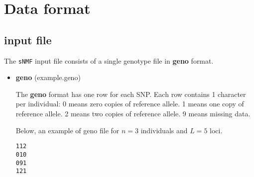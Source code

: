 \documentclass[10pt,a4paper]{article}
\begin{document}
\section{Data format}

\subsection{input file}
The {\tt sNMF} input file consists of a single genotype file in {\bf geno} format. 
\begin{itemize}
\item {\bf geno} (example.geno)

The {\bf geno} format has one row for each SNP.
  Each row contains 1 character per individual:
  0 means zero copies of reference allele.
  1 means one copy of reference allele.
  2 means two copies of reference allele.
  9 means missing data.

Below, an example of geno file for $n=3$ individuals and $L=5$ loci.
\begin{center}
\footnotesize
\begin{Verbatim}[frame=single]
112
010
091
121
\end{Verbatim}
\end{center}
\end{itemize}
\end{document}
